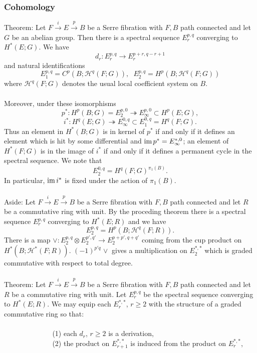 \documentclass[11pt]{article}
\begin{document}
\begin{Jandr SSS notes}
	\subsubsection{Cohomology}
Theorem: Let $F\overset{i}{\to} E\overset{p}{\to} B$ be a Serre fibration with $F,B$ path connected and let $G$ be an abelian group. Then there is a spectral sequence $E_r^{p,q}$ converging to $H^*(E;G)$. We have
\[d_r:E_r^{p,q}\to E_r^{p+r,q-r+1}\]
and natural identifications
\[E_1^{p,q}=C^p(B;\mathscr{H}^q(F;G)),
\hspace{7pt}
E_2^{p,q}=H^p(B;\mathscr{H}^q(F;G))\]
where $\mathscr{H}^q(F;G)$ denotes the usual local coefficient system on $B$.\\
\\
Moreover, under these isomorphisms
\[p^*:H^p(B;G)=E_2^{p,0}\twoheadrightarrow E_{\infty}^{p,0}\subset H^p(E;G),\]
\[i^*:H^q(E;G)\twoheadrightarrow E_{\infty}^{0,q}\subset E_1^{0,q}=H^q(F;G).\]
Thus an element in $H^*(B;G)$ is in kernel of $p^*$ if and only if it defines an element which is hit by some differential and $\operatorname{im} p^*=E_{\infty}^{*,0}$; an element of $H^*(F;G)$ is in the image of $i^*$ if and only if it defines a permanent cycle in the spectral sequence. We note that
\[E_2^{0,q}=H^q(F;G)^{\pi_1(B)}.\]
In particular, $\operatorname{im} i^*$ is fixed under the action of $\pi_1(B)$.\\
\\
Aside: Let $F\overset{i}{\to} E\overset{p}{\to} B$ be a Serre fibration with $F,B$ path connected and let $R$ be a commutative ring with unit. By the proceding theorem there is a spectral sequence $E_r^{p,q}$ converging to $H^*(E;R)$ and we have
\[E_2^{p,q}=H^p(B;\mathscr{H}^q(F;R)).\]
There is a map $\vee:E_2^{p,q}\otimes E_2^{p',q'}\to E_2^{p+p',q+q'}$ coming from the cup product on $H^*(B;\mathscr{H}^*(F;R))$. $(-1)^{p'q}\hspace{1pt}\vee$ gives a multiplication on $E_2^{*,*}$ which is graded commutative with respect to total degree.\\
\\
Theorem: Let $F\overset{i}{\to} E\overset{p}{\to} B$ be a Serre fibration with $F,B$ path connected and let $R$ be a commutative ring with unit. Let $E_r^{p,q}$ be the spectral sequence converging to $H^*(E;R)$. We may equip each $E_r^{*,*}$, $r\geq 2$ with the structure of a graded commutative ring so that:\\
\\
$\phantom{poopoopoopoopo}$(1) each $d_r$, $r\geq 2$ is a derivation,\\
$\phantom{poopoopoopoopo}$(2) the product on $E_{r+1}^{*,*}$ is induced from the product on $E_r^{*,*}$,\\

\end{Jandr SSS notes}
\end{document}

